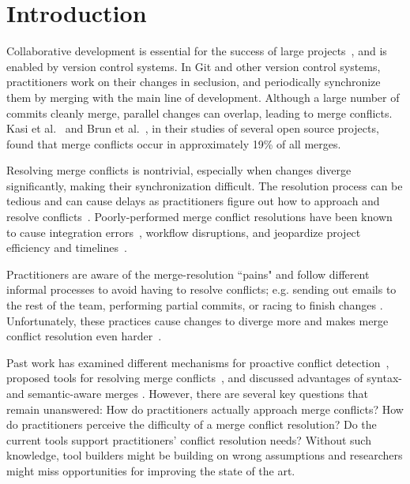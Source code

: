 
\section{Introduction}\label{introduction}

Collaborative development is essential for the success of large projects~\cite{hattori2010syde}, and is enabled by version control systems. 
In Git and other version control systems, practitioners work on their changes in seclusion, and periodically synchronize them by merging with the main line of development. 
Although a large number of commits cleanly merge, parallel changes can overlap, leading to merge conflicts. Kasi et al.~\cite{cassandra} and Brun et al.~\cite{Brun2011}, in their studies of several open source projects, found that merge conflicts occur in approximately 19\% of all merges.

Resolving merge conflicts is nontrivial, especially when changes diverge significantly, making their synchronization difficult.
The resolution process can be tedious and can cause delays as practitioners figure out how to approach and resolve conflicts~\cite{cassandra}. 
Poorly-performed merge conflict resolutions have been known to cause integration errors~\cite{bird-branches-conflict}, workflow disruptions, and jeopardize project efficiency and timelines~\cite{estler2014awareness}. 

Practitioners are aware of the merge-resolution ``pains" and follow different informal processes to avoid having to resolve conflicts; e.g. sending out emails to the rest of the team, performing partial commits, or racing to finish changes \cite{deSouza2003breaking}\cite{cataldo2008distributed_dev}.
Unfortunately, these practices cause changes to diverge more and makes merge conflict resolution even harder~\cite{Brun2011}. 

Past work has examined different mechanisms for proactive conflict detection~\cite{Brun2011}\cite{palantir}\cite{Guimaraes}, proposed tools for resolving merge conflicts~\cite{nishimura}\cite{mens2002state}, and discussed advantages of syntax- and semantic-aware merges \cite{danny_refactorings}\cite{hunt2002extensible}. 
However, there are several key questions that remain unanswered: How do practitioners actually approach merge conflicts? How do practitioners perceive the difficulty of a merge conflict resolution? Do the current tools support practitioners' conflict resolution needs?
Without such knowledge, tool builders might be building on wrong assumptions and researchers might miss opportunities for improving the state of the art.

